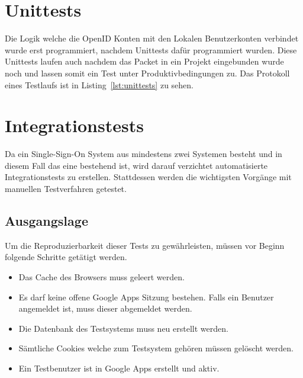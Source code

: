 
\section{Unittests}
\label{sec:unittests}
Die Logik welche die OpenID Konten mit den Lokalen Benutzerkonten verbindet wurde erst programmiert, nachdem Unittests dafür programmiert wurden. Diese Unittests laufen auch nachdem das Packet in ein Projekt eingebunden wurde noch und lassen somit ein Test unter Produktivbedingungen zu. Das Protokoll eines Testlaufs ist in Listing~\ref{lst:unittests} zu sehen.

{\minipage{\linewidth}
  
\endminipage}

\section{Integrationstests}
\label{sec:integrationstests}
Da ein Single-Sign-On System aus mindestens zwei Systemen besteht und in diesem Fall das eine bestehend ist, wird darauf verzichtet automatisierte Integrationstests zu erstellen. Stattdessen werden die wichtigsten Vorgänge mit manuellen Testverfahren getestet.

\subsection{Ausgangslage}
\label{sub:TestingAusgangslage}
Um die Reproduzierbarkeit dieser Tests zu gewährleisten, müssen vor Beginn folgende Schritte getätigt werden.

\begin{itemize}
    \item Das Cache des Browsers muss geleert werden.
    \item Es darf keine offene Google Apps Sitzung bestehen. Falls ein Benutzer
          angemeldet ist, muss dieser abgemeldet werden.
    \item Die Datenbank des Testsystems muss neu erstellt werden.
    \item Sämtliche Cookies welche zum Testsystem gehören müssen gelöscht
          werden.
    \item Ein Testbenutzer ist in Google Apps erstellt und aktiv.
\end{itemize}

